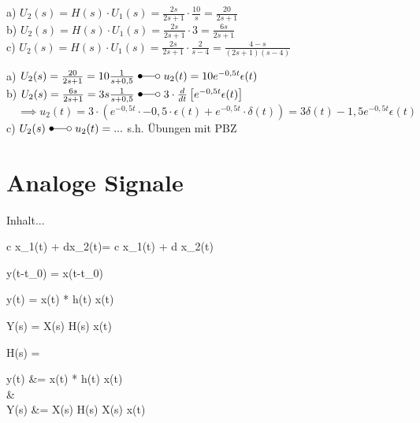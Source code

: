 \begin{tbox}
	a) $U_2(s) = H(s) \cdot U_1(s) = \frac{2s}{2s+1}\cdot \frac{10}{s} = \frac{20}{2s+1}$\\
	b) 	$U_2(s) = H(s) \cdot U_1(s) = \frac{2s}{2s+1}\cdot 3 = \frac{6s}{2s+1}$\\
	c)		$U_2(s) = H(s) \cdot U_1(s) = \frac{2s}{2s+1}\cdot \frac{2}{s-4} = \frac{4-s}{(2s+1)(s-4)}$
\end{tbox}

\begin{tbox}
	a) $U_2(s) = \frac{20}{2s + 1}= 10\frac{1}{s+0,5} \sLaplace u_2(t) = 10e^{-0,5t}\epsilon(t)$\\
	b) $U_2(s) = \frac{6s}{2s + 1} = 3s\frac{1}{s+0,5} \sLaplace  3 \cdot \frac{d}{dt} \left[ e^{-0,5t}\epsilon(t)\right] $\\
	$\quad\implies u_2(t) = 3 \cdot( e^{-0,5t}\cdot -0,5 \cdot \epsilon(t) + e^{-0,5t} \cdot \delta(t)) = 3\delta(t) - 1,5e^{-0,5t}\epsilon(t) $
	c) $U_2(s) \sLaplace u_2(t) = ...$ s.h. Übungen mit PBZ
\end{tbox}

\chapter{Analoge Signale}
\begin{abox}
	Inhalt...
\end{abox}


\begin{abox}
	\left\lbrace c \cdot x_1(t) + d\cdot x_2(t)\right\rbrace = c \cdot {}\left\lbrace x_1(t) \right\rbrace + d \cdot {}\left\lbrace x_2(t) \right\rbrace
\end{abox}

\begin{abox}
	y(t-t_0) = \left\lbrace x(t-t_0) \right\rbrace
\end{abox}

\begin{abox}
	y(t) = x(t) * h(t) \quad {} x(t) \in {}
\end{abox}

\begin{abox}
	Y(s) = X(s) \cdot H(s)  \quad {} x(t) \in {}
\end{abox}

\begin{abox}
	H(s) = 
\end{abox}

\begin{abox}
	y(t) &= x(t) * h(t) \quad {} x(t) \in {}\\
	&\ztrans\\
	Y(s) &= X(s) \cdot H(s) \quad {} X(s) \slaplace x(t) \in {}
\end{abox}


